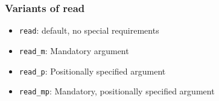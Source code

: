 \documentclass{beamer}
\begin{document}
\begin{frame}[fragile]
\frametitle{Variants of read}
\begin{itemize}
	\item \verb!read!: default, no special requirements
	\item \verb!read_m!: Mandatory argument
	\item \verb!read_p!: Positionally specified argument
	\item \verb!read_mp!: Mandatory, positionally specified argument
\end{itemize}
\end{frame}

%  

\end{document}
